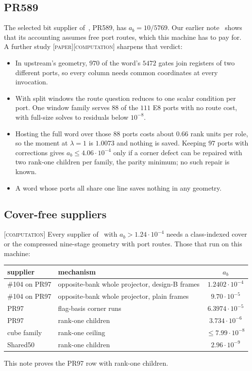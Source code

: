 \documentclass[11pt]{amsart}
\theoremstyle{remark}
\newcommand{\tagP}{\textsc{[paper]}}
\newcommand{\tagC}{\textsc{[computation]}}
\begin{document}
\subsection{PR589}
The selected bit supplier of~\cite{CS}, PR589, has $a_b = 10/5769$. Our earlier
note~\cite{HOLE} shows that its accounting assumes free port routes, which this machine has to
pay for. A further study \tagP\tagC{} sharpens that verdict:
\begin{itemize}
\item In upstream's geometry, $970$ of the word's $5472$ gates join registers of two different
  ports, so every column needs common coordinates at every invocation.
\item With split windows the route question reduces to one scalar condition per port. One
  window family serves $88$ of the $111$ E8 ports with no route cost, with full-size solves to
  residuals below $10^{-8}$.
\item Hosting the full word over those $88$ ports costs about $0.66$ rank units per role, so the
  moment at $\lambda = 1$ is $1.0073$ and nothing is saved. Keeping $97$ ports with corrections
  gives $a_b \le 4.06 \cdot 10^{-4}$ only if a corner defect can be repaired with two rank-one
  children per family, the parity minimum; no such repair is known.
\item A word whose ports all share one line saves nothing in any geometry.
\end{itemize}

\subsection{Cover-free suppliers}
\tagC{} Every supplier of~\cite{CS} with $a_b > 1.24 \cdot 10^{-4}$ needs a class-indexed cover
or the compressed nine-stage geometry with port routes. Those that run on this machine:
\begin{center}
\begin{tabular}{llc}
\toprule
supplier & mechanism & $a_b$\\
\midrule
\#104 on PR97 & opposite-bank whole projector, design-B frames & $1.2402 \cdot 10^{-4}$\\
\#104 on PR97 & opposite-bank whole projector, plain frames & $9.70 \cdot 10^{-5}$\\
PR97 & flag-basis corner runs & $6.3974 \cdot 10^{-5}$\\
PR97 & rank-one children & $3.734 \cdot 10^{-6}$\\
cube family & rank-one ceiling & $\le 7.99 \cdot 10^{-8}$\\
Shared50 & rank-one children & $2.96 \cdot 10^{-9}$\\
\bottomrule
\end{tabular}
\end{center}
This note proves the PR97 row with rank-one children.
\end{document}
